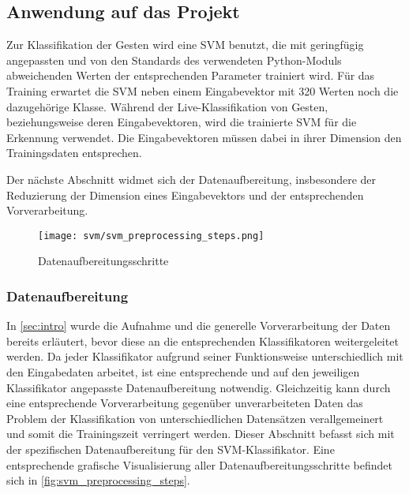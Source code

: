 
\subsection{Anwendung auf das Projekt}
Zur Klassifikation der Gesten wird eine \ac{SVM} benutzt, die mit geringfügig angepassten und von den Standards des verwendeten Python-Moduls abweichenden Werten der entsprechenden Parameter trainiert wird. 
Für das Training erwartet die \ac{SVM} neben einem Eingabevektor mit 320 Werten noch die dazugehörige Klasse.
Während der Live-Klassifikation von Gesten, beziehungsweise deren Eingabevektoren, wird die trainierte \ac{SVM} für die Erkennung verwendet.
Die Eingabevektoren müssen dabei in ihrer Dimension den Trainingsdaten entsprechen.

Der nächste Abschnitt widmet sich der Datenaufbereitung, insbesondere der Reduzierung der Dimension eines Eingabevektors und der entsprechenden Vorverarbeitung.
\begin{figure*}[htbp] \centering
    \texttt{[image: svm/svm\_preprocessing\_steps.png]}
    \caption{Datenaufbereitungsschritte}
    \label{fig:svm_preprocessing_steps}
\end{figure*}

\subsubsection{Datenaufbereitung}\label{sec:svm_data} 
In \autoref{sec:intro} wurde die Aufnahme und die generelle Vorverarbeitung der Daten bereits erläutert, bevor diese an die entsprechenden Klassifikatoren weitergeleitet werden.
Da jeder Klassifikator aufgrund seiner Funktionsweise unterschiedlich mit den Eingabedaten arbeitet, ist eine entsprechende und auf den jeweiligen Klassifikator angepasste Datenaufbereitung notwendig.
Gleichzeitig kann durch eine entsprechende Vorverarbeitung gegenüber unverarbeiteten Daten das Problem der Klassifikation von unterschiedlichen Datensätzen verallgemeinert und somit die Trainingszeit verringert werden.
Dieser Abschnitt befasst sich mit der spezifischen Datenaufbereitung für den \ac{SVM}-Klassifikator. 
Eine entsprechende grafische Visualisierung aller Datenaufbereitungsschritte befindet sich in \autoref{fig:svm_preprocessing_steps}.
